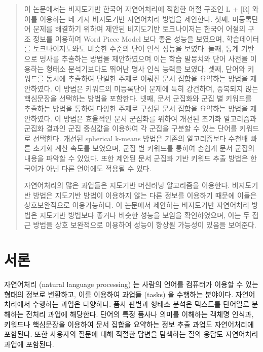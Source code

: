 \documentclass[oneside, ko,phd]{snuthesis_utf8_kor}
\begin{document}
\begin{abstract}
이 논문에서는 비지도기반 한국어 자연어처리에 적합한 어절 구조인 L + [R] 와 이를 이용하는 네 가지 비지도기반 자연어처리 방법을 제안한다.
첫째, 미등록단어 문제를 해결하기 위하여 제안된 비지도기반 토크나이저는 한국어 어절의 구조 정보를 이용하여 Word Piece Model 보다 좋은 성능을 보였으며, 학습데이터를 토크나이저도와도 비슷한 수준의 단어 인식 성능을 보였다.
둘째, 통계 기반으로 명사를 추출하는 방법을 제안하였으며 이는 학습 말뭉치와 단어 사전을 이용하는 형태소 분석기보다도 뛰어난 명사 인식 능력을 보였다.
셋째, 단어와 키워드를 동시에 추출하여 단일한 주제로 이뤄진 문서 집합을 요약하는 방법을 제안하였다.
이 방법은 키워드의 미등록단어 문제에 특히 강건하며, 중복되지 않는 핵심문장을 선택하는 방법을 포함한다.
넷째, 문서 군집화와 군집 별 키워드를 추출하는 방법을 통하여 다양한 주제로 구성된 문서 집합을 요약하는 방법을 제안하였다.
이 방법은 효율적인 문서 군집화를 위하여 개선된 초기화 알고리즘과 군집화 결과인 군집 중심값을 이용하여 각 군집을 구분할 수 있는 단어를 키워드로 선택한다.
개선된 spherical k-means 방법은 기존의 알고리즘보다 수천배 빠른 초기화 계산 속도를 보였으며, 군집 별 키워드를 통하여 손쉽게 문서 군집의 내용을 파악할 수 있었다.
또한 제안된 문서 군집화 기반 키워드 추출 방법은 한국어가 아닌 다른 언어에도 적용될 수 있다.

자연어처리의 많은 과업들은 지도기반 머신러닝 알고리즘을 이용한다.
비지도기반 방법은 지도기반 방법이 이용하지 않는 다른 정보를 이용하기 때문에 이들은 상호보완적으로 이용가능하다.
이 논문에서 제안하는 비지도기반 자연어처리 방법은 지도기반 방법보다 좋거나 비슷한 성능을 보임을 확인하였으며, 이는 두 접근 방법을 상호 보완적으로 이용하여 성능이 향상될 가능성이 있음을 보여준다.
\end{abstract}
\tableofcontents
{}
\cleardoublepage

\listoftables
{}
\cleardoublepage

\listoffigures
{}
\cleardoublepage


\chapter{서론}\label{introduction}
자연어처리 (natural language processing) 는 사람의 언어를 컴퓨터가 이용할 수 있는 형태의 정보로 변환하고, 이를 이용하여 과업들 (tasks) 을 수행하는 분야이다.
자연어처리에서 수행하는 과업은 다양하다.
품사 판별과 형태소 분석은 텍스트를 단어열로 분해하는 전처리 과업에 해당한다.
단어의 특정 품사나 의미를 이해하는 객체명 인식과, 키워드나 핵심문장을 이용하여 문서 집합을 요약하는 정보 추출 과업도 자연어처리에 포함된다.
또한 사용자의 질문에 대해 적절한 답변을 탐색하는 질의 응답도 자연어처리 과업에 포함된다.
\end{document}
